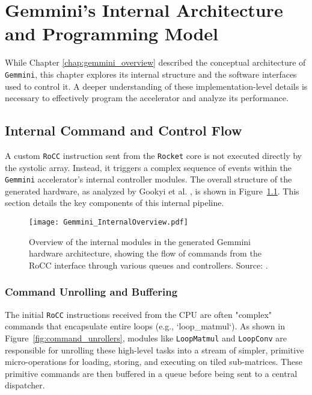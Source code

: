 \chapter{Gemmini's Internal Architecture and Programming Model}
\label{chap:gemmini_internals}

While Chapter \ref{chap:gemmini_overview} described the conceptual architecture of \texttt{Gemmini}, this chapter explores its internal structure and the software interfaces used to control it. A deeper understanding of these implementation-level details is necessary to effectively program the accelerator and analyze its performance.

\section{Internal Command and Control Flow}
\label{sec:gemmini_internal_flow}

A custom \texttt{RoCC} instruction sent from the \texttt{Rocket} core is not executed directly by the systolic array. Instead, it triggers a complex sequence of events within the \texttt{Gemmini} accelerator's internal controller modules. The overall structure of the generated hardware, as analyzed by Gookyi et al. \cite{gookyi2023gemmini_case_study}, is shown in Figure~\ref{fig:gemmini_internal_modules}. This section details the key components of this internal pipeline.

\begin{figure}[htbp]
    \centering
    \texttt{[image: Gemmini\_InternalOverview.pdf]}
    \caption{Overview of the internal modules in the generated Gemmini hardware architecture, showing the flow of commands from the RoCC interface through various queues and controllers. Source: \cite{gookyi2023gemmini_case_study}.}
    \label{fig:gemmini_internal_modules}
\end{figure}

\subsection{Command Unrolling and Buffering}
The initial \texttt{RoCC} instructions received from the CPU are often "complex" commands that encapsulate entire loops (e.g., `loop\_matmul`). As shown in Figure~\ref{fig:command_unrollers}, modules like \texttt{LoopMatmul} and \texttt{LoopConv} are responsible for unrolling these high-level tasks into a stream of simpler, primitive micro-operations for loading, storing, and executing on tiled sub-matrices. These primitive commands are then buffered in a queue before being sent to a central dispatcher.

